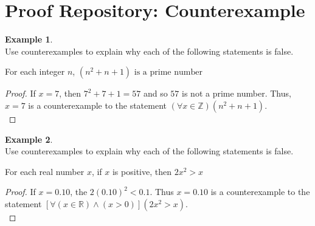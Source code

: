 \documentclass{book}
\theoremstyle{definition}
\newtheorem{example}{Example}[definition]
\theoremstyle{remark}
\newcommand{\bb}[1]{\mathbb{#1}}
\begin{document}
\section{Proof Repository: Counterexample}

\begin{example}
\cite[Chap.2, P.C.2.19, Q.1]{ted} \\

Use counterexamples to explain why each of the following statements is false. 

\begin{center}
    For each integer $n$, $(n^2 + n + 1) \text{ is a prime number}$ \\
\end{center}

\begin{proof}
    If $x = 7$, then $7^2 + 7 + 1 = 57$ and so $57$ is not a prime number. Thus, $x = 7$ is a counterexample to the statement $(\forall x \in \bb{Z})(n^2 + n + 1)$. \\
\end{proof}
\end{example}


\begin{example}
\cite[Chap.2, P.C.2.19, Q.2]{ted} \\

Use counterexamples to explain why each of the following statements is false. 

\begin{center}
    For each real number $x$, if $x$ is positive, then $2x^2 > x $ \\
\end{center}

\begin{proof}
    If $x = 0.10$, the $2(0.10)^2 < 0.1$. Thus $x = 0.10$ is a counterexample to the statement $[\forall (x \in \bb{R}) \wedge (x > 0)](2x^2 > x)$. \\
\end{proof}
\end{example}
\end{document}
